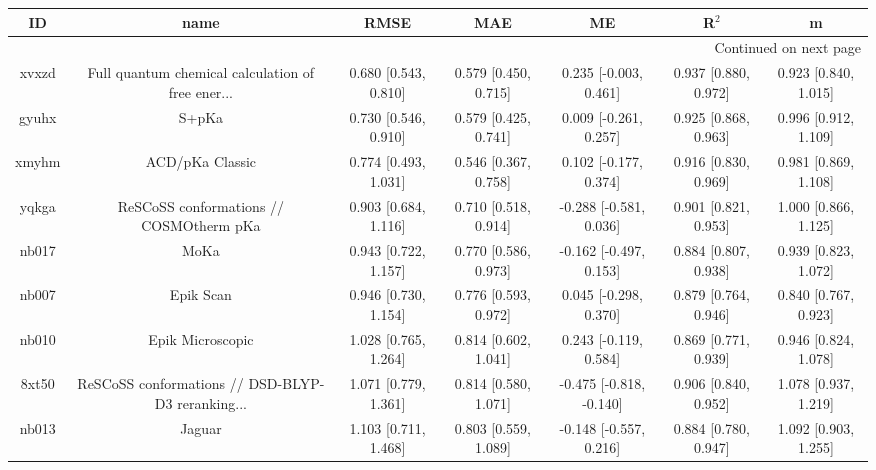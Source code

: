 \documentclass{article}
\begin{document}
\begin{center}
\begin{longtable}{|ccccccc|}
\toprule
    ID &                                               name &                  RMSE &                   MAE &                       ME &                 R$^2$ &                      m \\
\midrule
\endhead
\midrule
\multicolumn{7}{r}{{Continued on next page}} \\
\midrule
\endfoot

\bottomrule
\endlastfoot
 xvxzd &  Full quantum chemical calculation of free ener... &  0.680 [0.543, 0.810] &  0.579 [0.450, 0.715] &    0.235 [-0.003, 0.461] &  0.937 [0.880, 0.972] &   0.923 [0.840, 1.015] \\
 gyuhx &                                              S+pKa &  0.730 [0.546, 0.910] &  0.579 [0.425, 0.741] &    0.009 [-0.261, 0.257] &  0.925 [0.868, 0.963] &   0.996 [0.912, 1.109] \\
 xmyhm &                                    ACD/pKa Classic &  0.774 [0.493, 1.031] &  0.546 [0.367, 0.758] &    0.102 [-0.177, 0.374] &  0.916 [0.830, 0.969] &   0.981 [0.869, 1.108] \\
 yqkga &            ReSCoSS conformations // COSMOtherm pKa &  0.903 [0.684, 1.116] &  0.710 [0.518, 0.914] &   -0.288 [-0.581, 0.036] &  0.901 [0.821, 0.953] &   1.000 [0.866, 1.125] \\
 nb017 &                                               MoKa &  0.943 [0.722, 1.157] &  0.770 [0.586, 0.973] &   -0.162 [-0.497, 0.153] &  0.884 [0.807, 0.938] &   0.939 [0.823, 1.072] \\
 nb007 &                                          Epik Scan &  0.946 [0.730, 1.154] &  0.776 [0.593, 0.972] &    0.045 [-0.298, 0.370] &  0.879 [0.764, 0.946] &   0.840 [0.767, 0.923] \\
 nb010 &                                   Epik Microscopic &  1.028 [0.765, 1.264] &  0.814 [0.602, 1.041] &    0.243 [-0.119, 0.584] &  0.869 [0.771, 0.939] &   0.946 [0.824, 1.078] \\
 8xt50 &  ReSCoSS conformations // DSD-BLYP-D3 reranking... &  1.071 [0.779, 1.361] &  0.814 [0.580, 1.071] &  -0.475 [-0.818, -0.140] &  0.906 [0.840, 0.952] &   1.078 [0.937, 1.219] \\
 nb013 &                                             Jaguar &  1.103 [0.711, 1.468] &  0.803 [0.559, 1.089] &   -0.148 [-0.557, 0.216] &  0.884 [0.780, 0.947] &   1.092 [0.903, 1.255] \\

\end{longtable}
\end{center}
\end{document}
